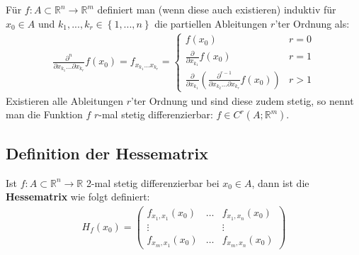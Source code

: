 \documentclass[11pt,a4paper]{book}
\newcommand {\R}	{\mathbb{R}}
\newcommand {\Rn}	{\mathbb{R}^n}
\newcommand {\Rm}	{\mathbb{R}^m}
\newcommand{\1}    	{\mathbbm{1}}
\begin{document}
Für \(f : A \subset \Rn \rightarrow \Rm \) definiert man (wenn diese auch existieren) induktiv für \(x_0 \in A\) und \(k_1, ..., k_r \in \left\{ 1, ..., n \right\} \) die partiellen Ableitungen \(r\)'ter Ordnung als:
\begin{align*}
	\frac{\partial^n}{\partial x_{k_1} \hdots \partial x_{k_r} } f(x_0) = f_{x_{k_1} \hdots x_{k_r}} = 
	\left\{ \begin{array}{ll}
		f(x_0) & r = 0 \\
		\frac{\partial}{\partial x_{k_1}} f(x_0) & r = 1 \\
		\frac{\partial}{\partial x_{k_1}} \left( \frac{\partial^{r-1}}{\partial x_{k_2} \hdots \partial x_{k_r}} f(x_0) \right) & r > 1
	\end{array} \right.
\end{align*}
Existieren alle Ableitungen \(r\)'ter Ordnung und sind diese zudem stetig, so nennt man die Funktion \(f\) \(r\)-mal stetig differenzierbar: \(f \in C^r(A;\Rm)\).

\subsection{Definition der Hessematrix}
Ist \(f : A \subset \Rn \rightarrow \R\) 2-mal stetig differenzierbar bei \(x_0 \in A\), dann ist die \textbf{Hessematrix} wie folgt definiert:
\begin{align*}
	H_f(x_0) = \left( \begin{array}{ccc}
		f_{x_1,x_1} (x_0) & \hdots & f_{x_1,x_n} (x_0) \\
		\vdots & & \vdots \\
		f_{x_m,x_1} (x_0) & \hdots & f_{x_m,x_n} (x_0)
	\end{array} \right)
\end{align*}
\end{document}
